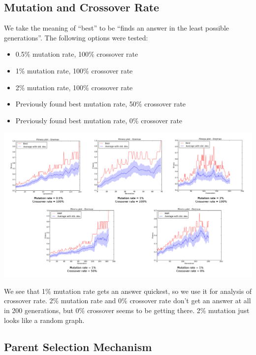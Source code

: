 \documentclass[a4paper,12pt]{article}
\begin{document}
\subsection{Mutation and Crossover Rate}
We take the meaning of ``best'' to be ``finds an answer in the least possible generations''. The following options were tested: 
\begin{itemize}
\item{0.5\% mutation rate, 100\% crossover rate}
\item{1\% mutation rate, 100\% crossover rate}
\item{2\% mutation rate, 100\% crossover rate}
\item{Previously found best mutation rate, 50\% crossover rate}
\item{Previously found best mutation rate, 0\% crossover rate}
\end{itemize}


\centerline{\includegraphics[width=1.2\textwidth]{graph_bundle_1}}

We see that 1\% mutation rate gets an answer quickest, so we use it for analysis of crossover rate. 2\% mutation rate and 0\% crossover rate don't get an answer at all in 200 generations, but 0\% crossover seems to be getting there. 2\% mutation just looks like a random graph.

\subsection{Parent Selection Mechanism}

\end{document}
